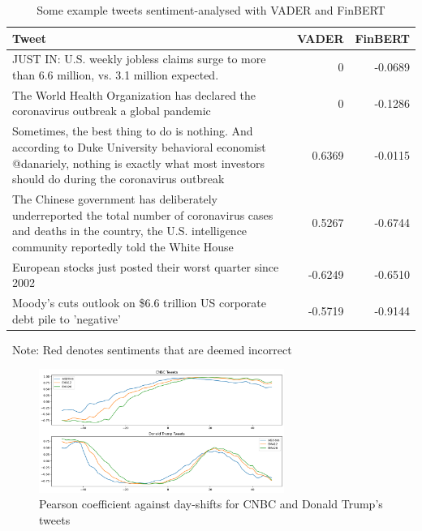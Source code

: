 \documentclass{article}
\begin{document}
\begin{table}[tbh]
  \centering
  \caption{Some example tweets sentiment-analysed with VADER and FinBERT}
    \begin{tabular}{|p{12em}|r|r|}
    \toprule
    Tweet & \multicolumn{1}{p{3em}|}{VADER} & \multicolumn{1}{p{3em}|}{FinBERT} \\
    \midrule
    JUST IN: U.S. weekly jobless claims surge to more than 6.6 million, vs. 3.1 million expected. & \textcolor[rgb]{ 1,  0,  0}{0} & -0.0689 \\
    \midrule
    The World Health Organization has declared the coronavirus outbreak a global pandemic & \textcolor[rgb]{ 1,  0,  0}{0} & -0.1286 \\
    \midrule
    Sometimes, the best thing to do is nothing. And according to Duke University behavioral economist @danariely, nothing is exactly what most investors should do during the coronavirus outbreak & \textcolor[rgb]{ 1,  0,  0}{0.6369} & -0.0115 \\
    \midrule
    The Chinese government has deliberately underreported the total number of coronavirus cases and deaths in the country, the U.S. intelligence community reportedly told the White House & \textcolor[rgb]{ 1,  0,  0}{0.5267} & -0.6744 \\
    \midrule
    European stocks just posted their worst quarter since 2002 & \textcolor[rgb]{ .129,  .129,  .129}{-0.6249} & \textcolor[rgb]{ .129,  .129,  .129}{-0.6510} \\
    \midrule
    Moody's cuts outlook on \$6.6 trillion US corporate debt pile to 'negative'  & \textcolor[rgb]{ .129,  .129,  .129}{-0.5719} & \textcolor[rgb]{ .129,  .129,  .129}{-0.9144} \\
    \bottomrule
    \end{tabular}%
    \
    Note: Red denotes sentiments that are deemed incorrect
  \label{tab:tweets_vader_finbert}%
\end{table}%

\begin{figure}[tbh]
    \includegraphics[width=8cm]{figure_pearson_coeff.png}
    \caption{Pearson coefficient against day-shifts for CNBC and Donald Trump's tweets \label{figure_pearson}}
\end{figure}
\end{document}
